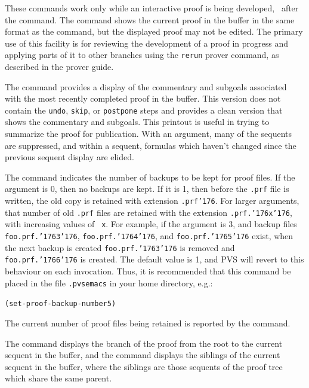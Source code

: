 These commands work only while an interactive proof is being developed,
\ie\ after the  command.  The  command
shows the current proof in the  buffer in the same format as
the  command, but the displayed proof may not be edited.
The primary use of this facility is for reviewing the development of a
proof in progress and applying parts of it to other branches using the
\texttt{rerun} prover command, as described in the prover guide\cite{PVS:prover}.


The  command provides a display of the commentary and
subgoals associated with the most recently completed proof in the
 buffer.  This version does not contain the
\texttt{undo}, \texttt{skip}, or \texttt{postpone} steps and provides a
clean version that shows the commentary and subgoals.  This printout is
useful in trying to summarize the proof for publication.  With an
argument, many of the sequents are suppressed, and within a sequent,
formulas which haven't changed since the previous sequent display are
elided.

\label{proof-backups}
The  command indicates the number of
backups to be kept for proof files.  If the argument is 0, then
no backups are kept.  If it is 1, then before the {\tt .prf} file is
written, the old copy is retained with extension {\tt .prf\char'176}.
For larger arguments, that number of old {\tt .prf} files are retained with the
extension {\tt .prf.\char'176x\char'176}, with increasing values of {\tt
x}.  For example, if the argument is 3, and backup files
{\tt foo.prf.\char'176{3}\char'176}, 
{\tt foo.prf.\char'176{4}\char'176}, and
{\tt foo.prf.\char'176{5}\char'176} exist, when the next backup
is created {\tt foo.prf.\char'176{3}\char'176} is removed and
{\tt foo.prf.\char'176{6}\char'176} is created.  The default value
is 1, and PVS will revert to this behaviour on each invocation.  Thus,
it is recommended that this command be placed in the file {\tt .pvsemacs}
in your home directory, e.g.:
\begin{alltt}
(set-proof-backup-number 5)
\end{alltt}
The current number of proof files being retained is reported
by the  command.

The  command displays the branch of the proof from the root
to the current sequent in the  buffer, and the
 command displays the siblings of the current sequent in the
 buffer, where the siblings are those sequents of the proof
tree which share the same parent.

